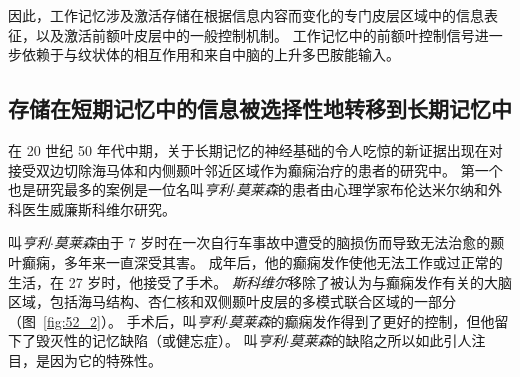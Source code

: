 因此，工作记忆涉及激活存储在根据信息内容而变化的专门皮层区域中的信息表征，以及激活前额叶皮层中的一般控制机制。
工作记忆中的前额叶控制信号进一步依赖于与纹状体的相互作用和来自中脑的上升多巴胺能输入。



\subsection{存储在短期记忆中的信息被选择性地转移到长期记忆中}

在 20 世纪 50 年代中期，关于长期记忆的神经基础的令人吃惊的新证据出现在对接受双边切除海马体和内侧颞叶邻近区域作为癫痫治疗的患者的研究中。
第一个也是研究最多的案例是一位名叫\textit{亨利$\cdot$莫莱森}的患者由心理学家布伦达米尔纳和外科医生威廉斯科维尔研究。


叫\textit{亨利$\cdot$莫莱森}由于 7 岁时在一次自行车事故中遭受的脑损伤而导致无法治愈的颞叶癫痫，多年来一直深受其害。
成年后，他的癫痫发作使他无法工作或过正常的生活，在 27 岁时，他接受了手术。
\textit{斯科维尔}移除了被认为与癫痫发作有关的大脑区域，包括海马结构、杏仁核和双侧颞叶皮层的多模式联合区域的一部分（图~\ref{fig:52_2}）。
手术后，叫\textit{亨利$\cdot$莫莱森}的癫痫发作得到了更好的控制，但他留下了毁灭性的记忆缺陷（或健忘症）。
叫\textit{亨利$\cdot$莫莱森}的缺陷之所以如此引人注目，是因为它的特殊性。


